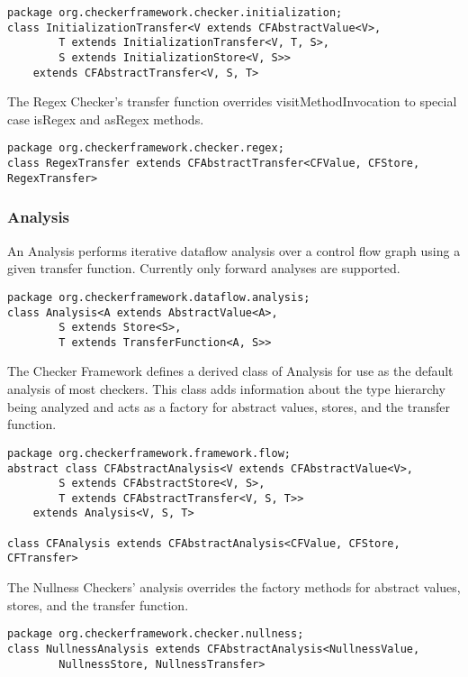 \begin{verbatim}
package org.checkerframework.checker.initialization;
class InitializationTransfer<V extends CFAbstractValue<V>,
        T extends InitializationTransfer<V, T, S>,
        S extends InitializationStore<V, S>>
    extends CFAbstractTransfer<V, S, T>
\end{verbatim}

The Regex Checker's transfer function overrides visitMethodInvocation
to special case isRegex and asRegex methods.

\begin{verbatim}
package org.checkerframework.checker.regex;
class RegexTransfer extends CFAbstractTransfer<CFValue, CFStore, RegexTransfer>
\end{verbatim}


\subsubsection{Analysis}
\label{sec:analysis_classes}

An Analysis performs iterative dataflow analysis over a control flow
graph using a given transfer function.  Currently only forward
analyses are supported.

\begin{verbatim}
package org.checkerframework.dataflow.analysis;
class Analysis<A extends AbstractValue<A>,
        S extends Store<S>,
        T extends TransferFunction<A, S>>
\end{verbatim}

The Checker Framework defines a derived class of Analysis for use as
the default analysis of most checkers.  This class adds information
about the type hierarchy being analyzed and acts as a factory for
abstract values, stores, and the transfer function.

\begin{verbatim}
package org.checkerframework.framework.flow;
abstract class CFAbstractAnalysis<V extends CFAbstractValue<V>,
        S extends CFAbstractStore<V, S>,
        T extends CFAbstractTransfer<V, S, T>>
    extends Analysis<V, S, T>

class CFAnalysis extends CFAbstractAnalysis<CFValue, CFStore, CFTransfer>
\end{verbatim}

The Nullness Checkers' analysis overrides the factory methods for
abstract values, stores, and the transfer function.

\begin{verbatim}
package org.checkerframework.checker.nullness;
class NullnessAnalysis extends CFAbstractAnalysis<NullnessValue,
        NullnessStore, NullnessTransfer>
\end{verbatim}

